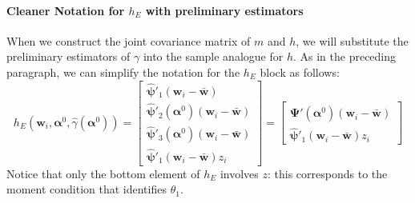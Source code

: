 \documentclass[12pt]{article}
\begin{document}
\paragraph{Cleaner Notation for $h_E$ with preliminary estimators}
When we construct the joint covariance matrix of $m$ and $h$, we will substitute the preliminary estimators of $\gamma$ into the sample analogue for $h$.
As in the preceding paragraph, we can simplify the notation for the $h_E$ block as follows:
\[
  h_E\left(\mathbf{w}_i, \boldsymbol{\alpha}^0, \widehat{\gamma}(\boldsymbol{\alpha}^0)\right) = \left[
  \begin{array}{l}
    \widehat{\boldsymbol{\psi}}'_1 (\mathbf{w}_i - \bar{\mathbf{w}})\\ 
    \widehat{\boldsymbol{\psi}}'_2(\boldsymbol{\alpha}^0) (\mathbf{w}_i - \bar{\mathbf{w}})\\ 
    \widehat{\boldsymbol{\psi}}'_3(\boldsymbol{\alpha}^0) (\mathbf{w}_i - \bar{\mathbf{w}})\\
    \widehat{\boldsymbol{\psi}}'_1 (\mathbf{w}_i - \bar{\mathbf{w}})z_i
  \end{array}
\right] = \left[
\begin{array}{l}
  \widehat{\boldsymbol{\Psi}}'(\boldsymbol{\alpha}^0)(\mathbf{w}_i - \bar{\mathbf{w}})\\
    \widehat{\boldsymbol{\psi}}'_1 (\mathbf{w}_i - \bar{\mathbf{w}})z_i
\end{array}
\right]
\]
Notice that only the bottom element of $h_E$ involves $z$: this corresponds to the moment condition that identifies $\theta_1$.
\end{document}
